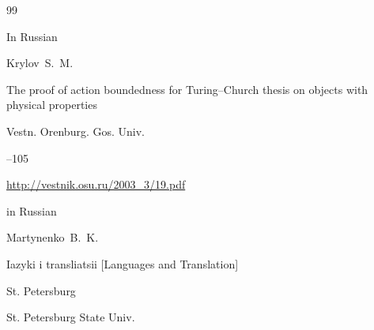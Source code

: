 \begin{thebibliography}{99}

\lang In Russian

\by Krylov~S.~M.

\paper The proof of action boundedness for Turing–Church thesis on objects with physical properties

\jour Vestn. Orenburg. Gos. Univ.



–105

\elink \url{http://vestnik.osu.ru/2003_3/19.pdf}




\lang in Russian

\by Martynenko~B.~K.

\book Iazyki i transliatsii \rm [Languages and Translation]

\publaddr St. Petersburg

\publ St. Petersburg State Univ.









\end{thebibliography}



\EngDate



\newpage

\Russian



%

